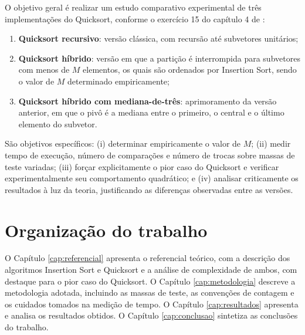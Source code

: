 O objetivo geral é realizar um estudo comparativo experimental de três
implementações do Quicksort, conforme o exercício 15 do capítulo 4 de
:

\begin{enumerate}
  \item \textbf{Quicksort recursivo}: versão clássica, com recursão até subvetores
        unitários;
  \item \textbf{Quicksort híbrido}: versão em que a partição é interrompida para
        subvetores com menos de $M$ elementos, os quais são ordenados por Insertion
        Sort, sendo o valor de $M$ determinado empiricamente;
  \item \textbf{Quicksort híbrido com mediana-de-três}: aprimoramento da versão
        anterior, em que o pivô é a mediana entre o primeiro, o central e o último
        elemento do subvetor.
\end{enumerate}

São objetivos específicos: (i) determinar empiricamente o valor de $M$; (ii) medir
tempo de execução, número de comparações e número de trocas sobre massas de teste
variadas; (iii) forçar explicitamente o pior caso do Quicksort e verificar
experimentalmente seu comportamento quadrático; e (iv) analisar criticamente os
resultados à luz da teoria, justificando as diferenças observadas entre as versões.

\section{Organização do trabalho}

O Capítulo \ref{cap:referencial} apresenta o referencial teórico, com a descrição
dos algoritmos Insertion Sort e Quicksort e a análise de complexidade de ambos,
com destaque para o pior caso do Quicksort. O Capítulo \ref{cap:metodologia}
descreve a metodologia adotada, incluindo as massas de teste, as convenções de
contagem e os cuidados tomados na medição de tempo. O Capítulo
\ref{cap:resultados} apresenta e analisa os resultados obtidos. O Capítulo
\ref{cap:conclusao} sintetiza as conclusões do trabalho.
